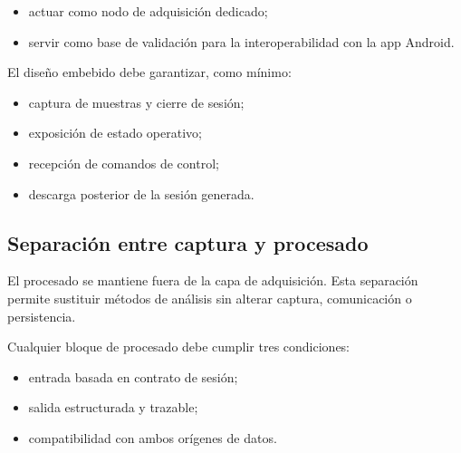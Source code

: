 \begin{itemize}
  \item actuar como nodo de adquisición dedicado;
  \item servir como base de validación para la interoperabilidad con la app Android.
\end{itemize}

El diseño embebido debe garantizar, como mínimo:

\begin{itemize}
  \item captura de muestras y cierre de sesión;
  \item exposición de estado operativo;
  \item recepción de comandos de control;
  \item descarga posterior de la sesión generada.
\end{itemize}

\label{fig:placeholder-adquisicion-doble-modo}

\label{fig:placeholder-hardware-embebido}

\subsection{Separación entre captura y procesado}

El procesado se mantiene fuera de la capa de adquisición. Esta separación permite sustituir métodos de análisis sin alterar captura, comunicación o persistencia.

Cualquier bloque de procesado debe cumplir tres condiciones:

\begin{itemize}
  \item entrada basada en contrato de sesión;
  \item salida estructurada y trazable;
  \item compatibilidad con ambos orígenes de datos.
\end{itemize}

